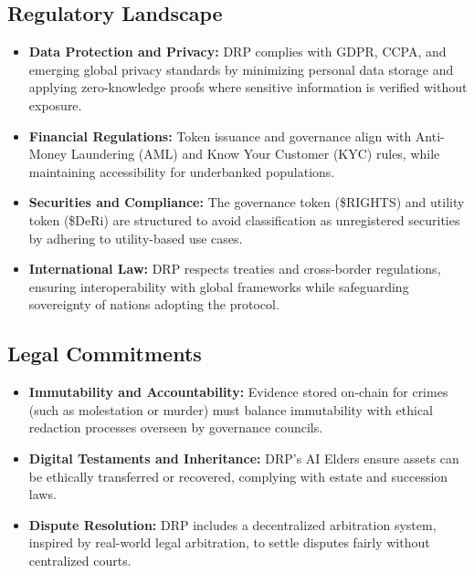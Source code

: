 \documentclass[11pt,a4paper]{article}
\begin{document}
\subsection{Regulatory Landscape}
\begin{itemize}
    \item \textbf{Data Protection and Privacy:}  
    DRP complies with GDPR, CCPA, and emerging global privacy standards by minimizing personal data storage and applying zero-knowledge proofs where sensitive information is verified without exposure.

    \item \textbf{Financial Regulations:}  
    Token issuance and governance align with Anti-Money Laundering (AML) and Know Your Customer (KYC) rules, while maintaining accessibility for underbanked populations.  

    \item \textbf{Securities and Compliance:}  
    The governance token (\$RIGHTS) and utility token (\$DeRi) are structured to avoid classification as unregistered securities by adhering to utility-based use cases.  

    \item \textbf{International Law:}  
    DRP respects treaties and cross-border regulations, ensuring interoperability with global frameworks while safeguarding sovereignty of nations adopting the protocol.  
\end{itemize}

\subsection{Legal Commitments}
\begin{itemize}
    \item \textbf{Immutability and Accountability:}  
    Evidence stored on-chain for crimes (such as molestation or murder) must balance immutability with ethical redaction processes overseen by governance councils.  

    \item \textbf{Digital Testaments and Inheritance:}  
    DRP’s AI Elders ensure assets can be ethically transferred or recovered, complying with estate and succession laws.  

    \item \textbf{Dispute Resolution:}  
    DRP includes a decentralized arbitration system, inspired by real-world legal arbitration, to settle disputes fairly without centralized courts.  
\end{itemize}
\end{document}
